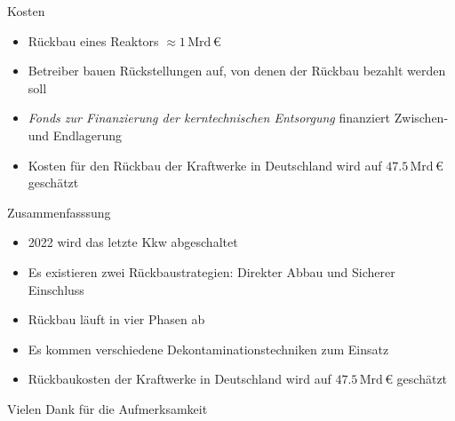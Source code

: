 \begin{frame}{Kosten}
  \begin{itemize}
    \setlength\itemsep{1.2em}
    \item{ Rückbau eines Reaktors $\approx 1 \,\mathrm{Mrd} \, \euro$ }
    \item{ Betreiber bauen Rückstellungen auf, von denen der Rückbau bezahlt werden soll}
    \item{ \emph{Fonds zur Finanzierung der kerntechnischen Entsorgung} finanziert Zwischen- und Endlagerung}
    \item{ Kosten für den Rückbau der Kraftwerke in Deutschland wird auf  $\num{47.5} \, \mathrm{Mrd} \,\euro$ geschätzt}
  \end{itemize}
\end{frame}



\begin{frame}{Zusammenfasssung}
  \begin{itemize}
    \setlength\itemsep{1.2em}
    \item { 2022 wird das letzte Kkw abgeschaltet}
    \item { Es existieren zwei Rückbaustrategien:  Direkter Abbau und Sicherer Einschluss}
    \item { Rückbau läuft in vier Phasen ab }
    \item { Es kommen verschiedene Dekontaminationstechniken zum Einsatz}
    \item { Rückbaukosten der Kraftwerke in Deutschland wird auf  $\num{47.5} \, \mathrm{Mrd} \,\euro$ geschätzt}
  \end{itemize}
\end{frame}



\begin{frame}[allowframebreaks]
  \nocite{*}
  \printbibliography
\end{frame}



\begin{frame}
  \begin{center}
  Vielen Dank für die
  Aufmerksamkeit
  \end{center}
\end{frame}




